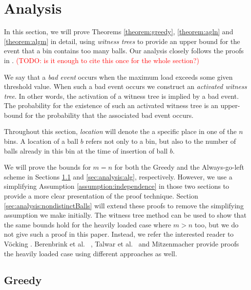 \documentclass[a4paper,12pt]{article}
\newcommand\todo[1]{\textcolor{red}{(TODO: #1)}}
\begin{document}
\section{Analysis}
\label{sec:analysis}
In this section, we will prove Theorems \ref{theorem:greedy}, \ref{theorem:agln} and \ref{theorem:algm} in detail, using \emph{witness trees} to provide an upper bound for the event that a bin contains too many balls. Our analysis closely follows the proofs in \cite{VOC03}. \todo{is it enough to cite this once for the whole section?}

We say that a \emph{bad event} occurs when the maximum load exceeds some given threshold value. When such a bad event occurs we construct an \emph{activated witness tree}. In other words, the activation of a witness tree is implied by a bad event. The probability for the existence of such an activated witness tree is an upper-bound for the probability that the associated bad event occurs.

Throughout this section, \emph{location} will denote the a specific place in one of the $n$ bins. A location of a ball $b$ refers not only to a bin, but also to the number of balls already in this bin at the time of insertion of ball $b$.

We will prove the bounds for $m=n$ for both the Greedy and the Always-go-left scheme in Sections \ref{sec:analysis:greedy} and \ref{sec:analysis:alg}, respectively. However, we use a simplifying Assumption \ref{assumption:independence} in those two sections to provide a more clear presentation of the proof technique. Section \ref{sec:analysis:nondistinctBalls} will extend these proofs to remove the simplifying assumption we make initially. The witness tree method can be used to show that the same bounds hold for the heavily loaded case where $m> n$ too, but we do not give such a proof in this paper. Instead, we refer the interested reader to V\"ocking \cite{VOC03}. Berenbrink et al.  ~\cite{BCSV06}, Talwar et al.~\cite{TW13} and Mitzenmacher \cite{MRS01} provide proofs the heavily loaded case using different approaches as well.

\subsection{Greedy}
\label{sec:analysis:greedy}
\end{document}
